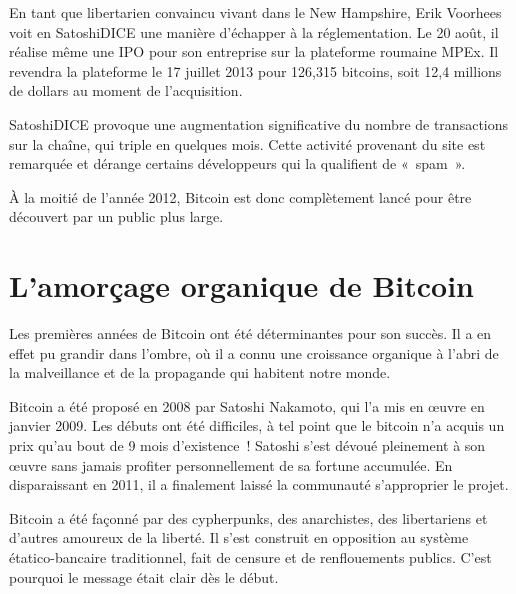 
En tant que libertarien convaincu vivant dans le New Hampshire, Erik Voorhees voit en SatoshiDICE une manière d'échapper à la réglementation. Le 20 août, il réalise même une IPO pour son entreprise sur la plateforme roumaine MPEx. Il revendra la plateforme le 17 juillet 2013 pour 126,315 bitcoins, soit 12,4 millions de dollars au moment de l'acquisition.

SatoshiDICE provoque une augmentation significative du nombre de transactions sur la chaîne, qui triple en quelques mois. Cette activité provenant du site est remarquée et dérange certains développeurs qui la qualifient de «~spam~».

À la moitié de l'année 2012, Bitcoin est donc complètement lancé pour être découvert par un public plus large.

\section{L'amorçage organique de Bitcoin}

Les premières années de Bitcoin ont été déterminantes pour son succès. Il a en effet pu grandir dans l'ombre, où il a connu une croissance organique à l'abri de la malveillance et de la propagande qui habitent notre monde.

Bitcoin a été proposé en 2008 par Satoshi Nakamoto, qui l'a mis en œuvre en janvier 2009. Les débuts ont été difficiles, à tel point que le bitcoin n'a acquis un prix qu'au bout de 9 mois d'existence~! Satoshi s'est dévoué pleinement à son œuvre sans jamais profiter personnellement de sa fortune accumulée. En disparaissant en 2011, il a finalement laissé la communauté s'approprier le projet.

Bitcoin a été façonné par des cypherpunks, des anarchistes, des libertariens et d'autres amoureux de la liberté. Il s'est construit en opposition au système étatico-bancaire traditionnel, fait de censure et de renflouements publics. C'est pourquoi le message était clair dès le début.

